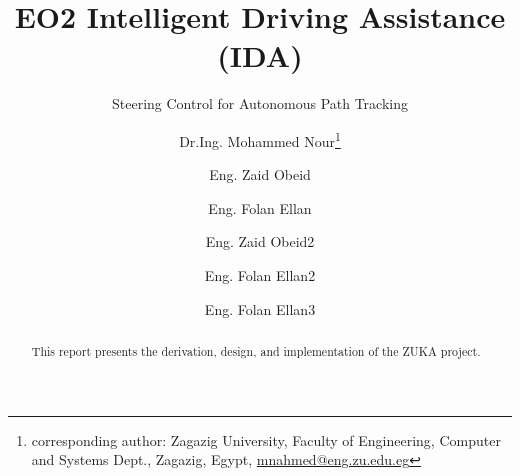 


\thispagestyle{scrplain}

\titlehead{Titelkopf}
\subject{EO2 Path Following Documentation}
\title{EO2 Intelligent Driving Assistance (IDA)}
\subtitle{Steering Control for Autonomous Path Tracking}
\author{Dr.Ing. Mohammed Nour\footnote{corresponding author: Zagazig University, Faculty of Engineering, Computer and Systems Dept., Zagazig, Egypt, \href{mailto:mnahmed@eng.zu.edu.eg}{mnahmed@eng.zu.edu.eg}} %
\and{Eng. Zaid Obeid}
\and{Eng. Folan Ellan}
\and{Eng. Zaid Obeid2}
\and{Eng. Folan Ellan2}
\and{Eng. Folan Ellan3}
}
\date{}%

\publishers{\vspace{15 mm}\texttt{[image: kuka]}}


\maketitle      %

\vfill
\begin{abstract}
This report presents the derivation, design, and implementation of the ZUKA project.
\end{abstract}

\clearpage
\pagestyle{scrheadings}
\tableofcontents
\clearpage

